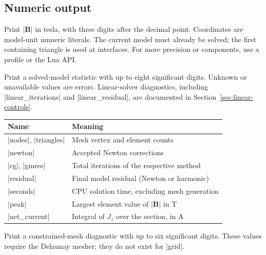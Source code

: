\subsection{Numeric output}
\begin{command}{\femmB{}}
Print $|\mathbf B|$ in tesla, with three digits after the decimal point.
Coordinates are model-unit numeric literals. The current model must
already be solved; the first containing triangle is used at interfaces.
For more precision or components, use a profile or the Lua API.
\end{command}
\begin{command}{\femmstat{}}
Print a solved-model statistic with up to eight significant digits.
Unknown or unavailable values are errors. Linear-solver diagnostics, including
|linear_iterations| and |linear_residual|, are documented in
Section~\ref{sec:linear-controls}.
\end{command}
\begin{center}
\begin{tabular}{ll}
\toprule Name & Meaning \\
\midrule
|nodes|, |triangles| & Mesh vertex and element counts \\
|newton| & Accepted Newton corrections \\
|cg|, |gmres| & Total iterations of the respective method \\
|residual| & Final model residual (Newton or harmonic) \\
|seconds| & CPU solution time, excluding mesh generation \\
|peak| & Largest element value of $|\mathbf B|$ in T \\
|net_current| & Integral of $J_z$ over the section, in A \\
\bottomrule
\end{tabular}
\end{center}
\begin{command}{\femmmeshstat{}}
Print a constrained-mesh diagnostic with up to six significant digits.
These values require the Delaunay mesher; they do not exist for |grid|.
\end{command}
